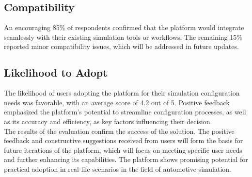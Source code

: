 \subsection{Compatibility}
An encouraging 85\% of respondents confirmed that the platform would integrate seamlessly with their existing simulation tools or workflows. The remaining 15\% reported minor compatibility issues, which will be addressed in future updates.\\


\subsection{Likelihood to Adopt}
The likelihood of users adopting the platform for their simulation configuration needs was favorable, with an average score of 4.2 out of 5. Positive feedback emphasized the platform's potential to streamline configuration processes, as well as its accuracy and efficiency, as key factors influencing their decision.\\


The results of the evaluation confirm the success of the solution. The positive feedback and constructive suggestions received from users will form the basis for future iterations of the platform, which will focus on meeting specific user needs and further enhancing its capabilities. The platform shows promising potential for practical adoption in real-life scenarios in the field of automotive simulation.


